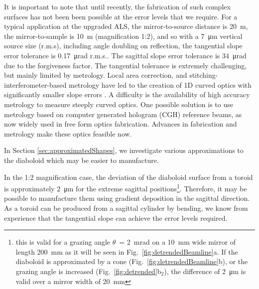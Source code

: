 \documentclass[preprint]{iucr}       %
\newcommand{\inred}[1]{{\color{red}#1}}
\begin{document}
It is important to note that until recently, the fabrication of such complex surfaces has not been been possible at the error levels that we require. For a typical application at the \inred{upgraded} ALS, the mirror-to-source distance is \SI{20}{\meter}\inred{, the mirror-to-sample is \SI{10}{\meter} (magnification 1:2)}, and so with a \SI{7}{\micro\meter} vertical source size \inred{(r.m.s)}, including angle doubling on reflection, the tangential slope error tolerance is \SI{0.17}{\micro\radian} \inred{r.m.s.}. The sagittal slope error tolerance is \SI{34}{\micro\radian} \inred{due to the forgiveness factor}. The tangential tolerance is extremely challenging, but mainly limited by metrology. Local area correction, and stitching-interferometer-based metrology have led to the creation of 1D curved optics with significantly smaller slope errors \cite{Yamauchi2002}. 
A difficulty is the availability of high accuracy metrology to measure steeply curved optics. One possible solution is to use metrology based on computer generated hologram (CGH) \inred{\cite{Wyant, Poleshchuk}} reference beams, as now widely used in free form optics fabrication. Advances in fabrication and metrology make these optics feasible now.

In Section \ref{sec:approximatedShapes}, we investigate various approximations to the diaboloid which may be easier to manufacture.

In the 1:2 magnification case, the deviation of the diaboloid surface from a toroid is approximately \SI{2}{\micro\meter} for the extreme sagittal positions\footnote{\inred{this is valid for a grazing angle $\theta$~= \SI{2}{\milli\radian} on a \SI{10}{\milli\meter} wide mirror of length \SI{200}{\milli\meter} as it will be seen in Fig.~\ref{fig:detrendedBeamline}a. If the diaboloid is approximated by a cone (Fig.~\ref{fig:detrendedBeamline}b), or the grazing angle is increased (Fig.~\ref{fig:detrended}b$_2$), the difference of \SI{2}{\micro\meter} is valid over a mirror width of \SI{20}{\milli\meter} }}. Therefore, it may be possible to manufacture them using gradient deposition in the sagittal direction. As a toroid can be produced from a sagittal cylinder by bending, we know from experience that the tangential slope can achieve the error levels required.
\end{document}
